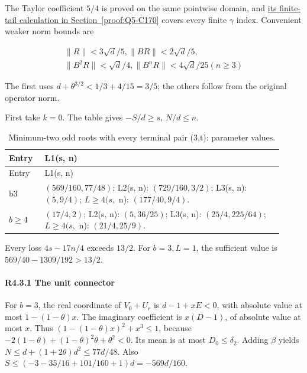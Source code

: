 The Taylor coefficient \(5/4\) is proved on the same pointwise domain, and \hyperref[part:C170.7]{its finite-tail calculation in Section~\ref{proof:Q5-C170}} covers every finite \(\gamma\) index. Convenient weaker norm bounds are

\[
\begin{gathered}
\|R\|<3\sqrt{d}/5,\|BR\|<2\sqrt{d}/5,\\
\|B^2R\|<\sqrt{d}/4,\|B^nR\|<4\sqrt{d}/25 (n\ge 3) 
\end{gathered}\tag{R4.3.1}
\]

The first uses \(d+\theta^{3/2}<1/3+4/15=3/5\); the others follow from the original operator norm.

First take \(k=0\). The table gives \(-S/d\ge s\), \(N/d\le n\).


\begingroup\small
\setlength{\tabcolsep}{3pt}
\setlength{\LTleft}{0pt}\setlength{\LTright}{\fill}
\begin{longtable}{@{}p{0.1200\linewidth}p{0.8000\linewidth}@{}}
\caption{Minimum-two odd roots with every terminal pair (3,t): parameter values.}\label{tab:parameters:r2-c004:2}\\
\toprule
Entry & L1(s, n) \\
\midrule\endfirsthead
\toprule
Entry & L1(s, n) \\
\midrule\endhead
\bottomrule\endfoot
b3 & \((569/160,\allowbreak 77/48)\); L2(s, n): \((729/160,\allowbreak 3/2)\); L3(s, n): \((5,\allowbreak 9/4)\); \(L\ge 4(s,\allowbreak \) n): \((177/40,\allowbreak 9/4)\). \\
\addlinespace[2pt]
\(b\ge 4\) & \((17/4,\allowbreak 2)\); L2(s, n): \((5,\allowbreak 36/25)\); L3(s, n): \((25/4,\allowbreak 225/64)\); \(L\ge 4(s,\allowbreak \) n): \((21/4,\allowbreak 25/9)\). \\
\end{longtable}
\endgroup


Every loss \(4s-17n/4\) exceeds \(13/2\). For \(b=3,\allowbreak \allowbreak  L=1\), the sufficient value is \(569/40-1309/192>13/2\).

\paragraph{R4.3.1 The unit connector}

For \(b=3\), the real coordinate of \(V_0+U_r\) is \(d-1+xE<0\), with absolute value at most \(1-(1-\theta)x\). The imaginary coefficient is \(x(D-1)\), of absolute value at most \(x\). Thus \((1-(1-\theta)x)^2+x^3\le1\), because \(-2(1-\theta)+(1-\theta)^2\theta+\theta^2<0\). Its mean is at most \(D_0\le \delta_2\). Adding \(\beta\) yields \(N\le d+(1+2\theta)d^2\le77d/48\). Also \(S\le(-3-35/16+101/160+1)d=-569d/160\).

